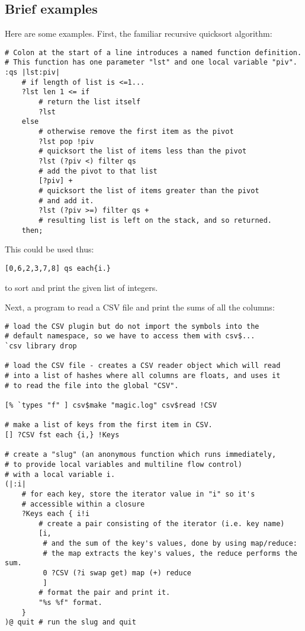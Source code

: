 \subsection{Brief examples}
Here are some examples. First, the familiar recursive
quicksort algorithm:
\begin{lstlisting}
# Colon at the start of a line introduces a named function definition.
# This function has one parameter "lst" and one local variable "piv".
:qs |lst:piv| 
    # if length of list is <=1...
    ?lst len 1 <= if
        # return the list itself
        ?lst 
    else 
        # otherwise remove the first item as the pivot
        ?lst pop !piv
        # quicksort the list of items less than the pivot
        ?lst (?piv <) filter qs 
        # add the pivot to that list
        [?piv] + 
        # quicksort the list of items greater than the pivot
        # and add it.
        ?lst (?piv >=) filter qs + 
        # resulting list is left on the stack, and so returned.
    then;
\end{lstlisting}
This could be used thus:
\begin{lstlisting}
[0,6,2,3,7,8] qs each{i.}
\end{lstlisting}
to sort and print the given list of integers.

\clearpage
Next, a program to read a CSV file and print the sums of all
the columns:
\begin{lstlisting}
# load the CSV plugin but do not import the symbols into the
# default namespace, so we have to access them with csv$...
`csv library drop

# load the CSV file - creates a CSV reader object which will read
# into a list of hashes where all columns are floats, and uses it
# to read the file into the global "CSV".

[% `types "f" ] csv$make "magic.log" csv$read !CSV

# make a list of keys from the first item in CSV.
[] ?CSV fst each {i,} !Keys

# create a "slug" (an anonymous function which runs immediately,
# to provide local variables and multiline flow control)
# with a local variable i.
(|:i|
    # for each key, store the iterator value in "i" so it's
    # accessible within a closure
    ?Keys each { i!i
        # create a pair consisting of the iterator (i.e. key name)
        [i, 
         # and the sum of the key's values, done by using map/reduce:
         # the map extracts the key's values, the reduce performs the sum.
         0 ?CSV (?i swap get) map (+) reduce
         ]
        # format the pair and print it.
        "%s %f" format.
    }
)@ quit # run the slug and quit
\end{lstlisting}

